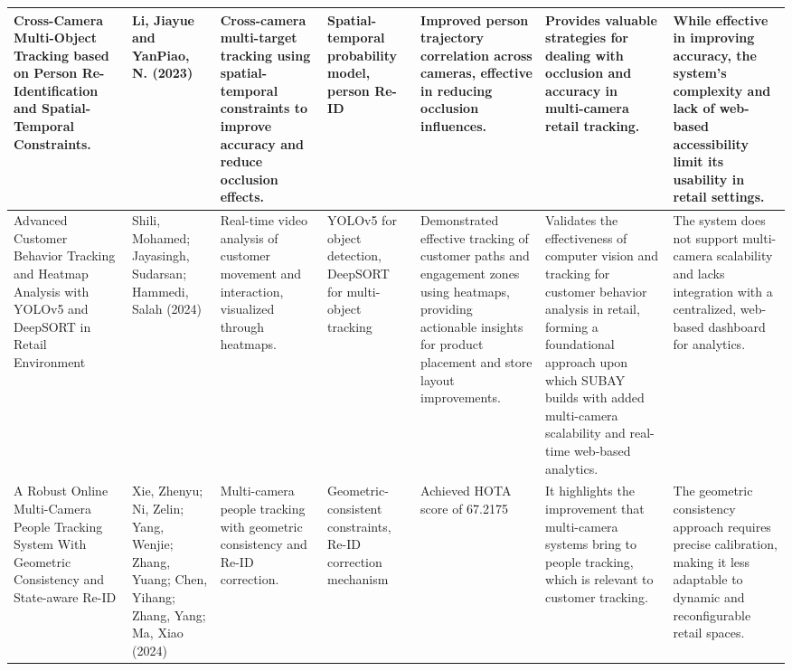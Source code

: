 {\begin{landscape}
\begin{longtable}{|p{2.5cm}|p{2.5cm}|p{2.7cm}|p{2.7cm}|p{2.5cm}|p{2.5cm}|p{2.5cm}|}
		Cross-Camera Multi-Object Tracking based on Person Re-Identification and Spatial-Temporal Constraints.
		& Li, Jiayue and YanPiao, N. (2023)
		& Cross-camera multi-target tracking using spatial-temporal constraints to improve accuracy and reduce occlusion effects.
		& Spatial-temporal probability model, person Re-ID
		& Improved person trajectory correlation across cameras, effective in reducing occlusion influences.
		& Provides valuable strategies for dealing with occlusion and accuracy in multi-camera retail tracking.
		& While effective in improving accuracy, the system's complexity and lack of web-based accessibility limit its usability in retail settings.\\
		\hline
		
		Advanced Customer Behavior Tracking and Heatmap Analysis with YOLOv5 and DeepSORT in Retail Environment
		& Shili, Mohamed; Jayasingh, Sudarsan; Hammedi, Salah (2024)
		& Real-time video analysis of customer movement and interaction, visualized through heatmaps.
		& YOLOv5 for object detection, DeepSORT for multi-object tracking
		& Demonstrated effective tracking of customer paths and engagement zones using heatmaps, providing actionable insights for product placement and store layout improvements.
		& Validates the effectiveness of computer vision and tracking for customer behavior analysis in retail, forming a foundational approach upon which SUBAY builds with added multi-camera scalability and real-time web-based analytics.
		& The system does not support multi-camera scalability and lacks integration with a centralized, web-based dashboard for analytics. \\
		\hline
		
		A Robust Online Multi-Camera People Tracking System With Geometric Consistency and State-aware Re-ID
		& Xie, Zhenyu; Ni, Zelin; Yang, Wenjie; Zhang, Yuang; Chen, Yihang; Zhang, Yang; Ma, Xiao (2024)
		& Multi-camera people tracking with geometric consistency and Re-ID correction.
		& Geometric-consistent constraints, Re-ID correction mechanism
		& Achieved HOTA score of 67.2175%
		& It highlights the improvement that multi-camera systems bring to people tracking, which is relevant to customer tracking.
		& The geometric consistency approach requires precise calibration, making it less adaptable to dynamic and reconfigurable retail spaces.\\
		\hline
		

\end{longtable}
\end{landscape}}
